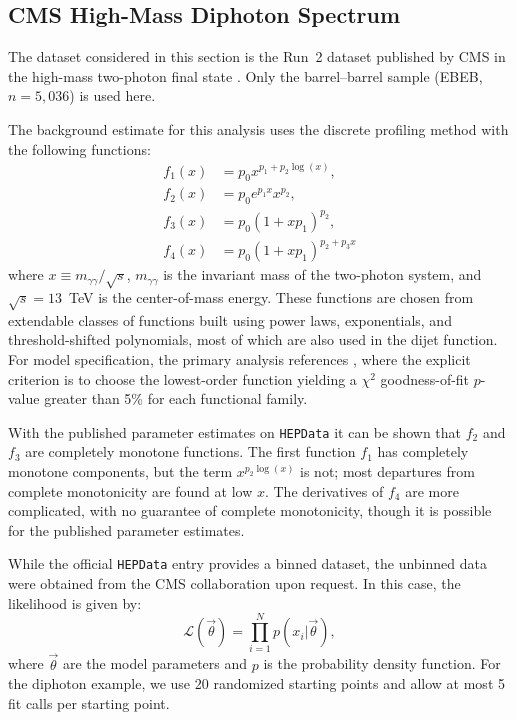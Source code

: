\documentclass[a4paper,11pt]{article}
\begin{document}
\subsection{CMS High-Mass Diphoton Spectrum} \label{sec:example2}

The dataset considered in this section is the Run~2 dataset published by CMS in the high-mass two-photon final state \cite{CMS_high_mass_diphoton}.
Only the barrel--barrel sample (EBEB, $n=5,036$) is used here.

The background estimate for this analysis uses the discrete profiling method with the following 
functions:
 \begin{subequations}\label{eq:diphoton_fns}
\begin{align}
    f_1(x)&=p_0x^{p_1+p_2\log(x)}, \label{eq:diphoton_f1} \\
    f_2(x)&=p_0e^{p_1x}x^{p_2}, \label{eq:diphoton_f2} \\
    f_3(x)&=p_0(1+xp_1)^{p_2}, \label{eq:diphoton_f3} \\
    f_4(x)&=p_0(1+xp_1)^{p_2+p_3x} \label{eq:diphoton_f4}
\end{align}
\end{subequations}
where $x\equiv m_{\gamma\gamma}/\sqrt{s}$, $m_{\gamma\gamma}$ is the invariant mass of the 
two-photon system, and $\sqrt{s}=13$~TeV is the center-of-mass energy.
These functions are chosen from extendable classes of functions built using power laws, exponentials, and threshold-shifted polynomials, most of which are also used in the dijet function. For model specification, the primary analysis references \cite{CMS_DP1}, where the explicit criterion is to choose the lowest-order function yielding a $\chi^2$ goodness-of-fit $p$-value greater than 5\% for each functional family.

With the published parameter estimates on \texttt{HEPData} it can be shown that $f_2$ and $f_3$ are completely monotone functions.
The first function $f_1$ has completely monotone components, but the term $x^{p_2 \log(x)}$ is not; most departures from complete monotonicity are found at low $x$. The derivatives of $f_4$ are more complicated, with no guarantee of complete monotonicity, though it is possible for the published parameter estimates.

While the official \texttt{HEPData} entry provides a binned dataset, the unbinned data were 
obtained from the CMS collaboration upon request.
In this case, the likelihood is given by:
\begin{equation}
    \mathcal{L}(\vec\theta) = \prod_{i=1}^N p(x_i|\vec\theta),
\end{equation}
where $\vec\theta$ are the model parameters and $p$ is the probability density function. For the diphoton example, we use 20 randomized starting points and allow at most 5 fit calls per starting point.
\end{document}
